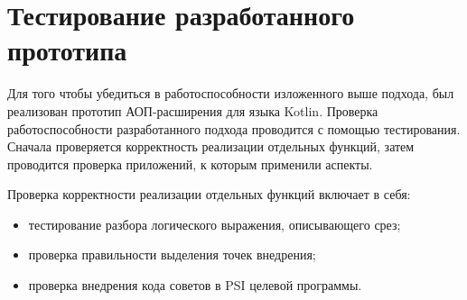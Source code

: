 \documentclass[conference]{IEEEtran}
\begin{document}

\section{Тестирование разработанного прототипа}


Для того чтобы убедиться в работоспособности изложенного выше подхода, был
реализован прототип АОП-расширения для языка Kotlin.
Проверка работоспособности разработанного подхода проводится с помощью
тестирования.
Сначала проверяется корректность реализации отдельных функций, затем проводится 
проверка приложений, к которым применили аспекты. 

Проверка  корректности реализации отдельных функций включает в себя:
\begin{itemize}
    \item тестирование разбора логического выражения, описывающего срез;
    \item проверка правильности выделения точек внедрения;
    \item проверка внедрения кода советов в PSI целевой программы.
\end{itemize}

\end{document}
